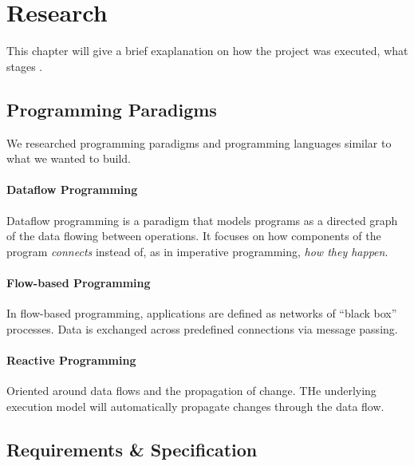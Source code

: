 \chapter{Research}
This chapter will give a brief exaplanation on how the project was
executed, what stages .




\section{Programming Paradigms}
We researched programming paradigms and programming languages similar
to what we wanted to build.

\subsubsection{Dataflow Programming}
Dataflow programming is a paradigm that models programs as a directed
graph of the data flowing between operations. It focuses on how
components of the program \emph{connects} instead of, as in imperative
programming, \emph{how they happen}. 

\subsubsection{Flow-based Programming}
In flow-based programming, applications are defined as networks of
``black box'' processes. Data is exchanged across predefined
connections via message passing. 

\subsubsection{Reactive Programming}
Oriented around data flows and the propagation of change. THe
underlying execution model will automatically propagate changes
through the data flow. 









\section{Requirements \& Specification}

